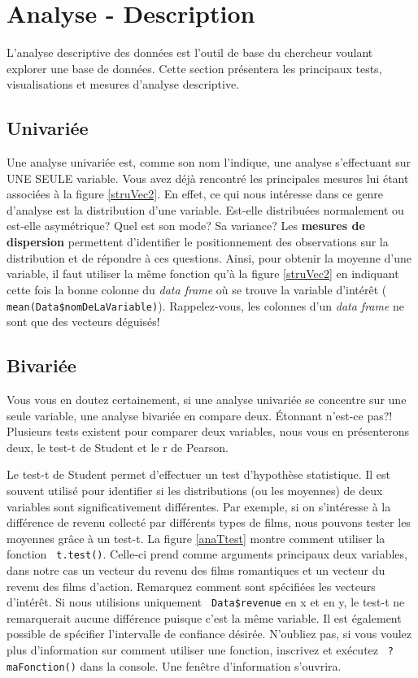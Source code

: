 \documentclass[10.5pt,a4paper]{article}
\newcommand{\rcode}[1]{\texttt{\color{rstudio} #1}}
\begin{document}
  
\section{Analyse - Description}
L'analyse descriptive des données est l'outil de base du chercheur voulant explorer une base de données. Cette section présentera les principaux tests, visualisations et mesures d'analyse descriptive.
  \subsection{Univariée}
  Une analyse univariée est, comme son nom l'indique, une analyse s'effectuant sur UNE SEULE variable. Vous avez déjà rencontré les principales mesures lui étant associées à la figure \ref{struVec2}. En effet, ce qui nous intéresse dans ce genre d'analyse est la distribution d'une variable. Est-elle distribuées normalement ou est-elle asymétrique? Quel est son mode? Sa variance? Les \textbf{mesures de dispersion} permettent d'identifier le positionnement des observations sur la distribution et de répondre à ces questions. Ainsi, pour obtenir la moyenne d'une variable, il faut utiliser la même fonction qu'à la figure \ref{struVec2} en indiquant cette fois la bonne colonne du \emph{data frame} où se trouve la variable d'intérêt (\rcode{mean(Data\$nomDeLaVariable)}). Rappelez-vous, les colonnes d'un \emph{data frame} ne sont que des vecteurs déguisés!
  
  \subsection{Bivariée}
  Vous vous en doutez certainement, si une analyse univariée se concentre sur une seule variable, une analyse bivariée en compare deux. Étonnant n'est-ce pas?! Plusieurs tests existent pour comparer deux variables, nous vous en présenterons deux, le test-t de Student et le r de Pearson. 
  
  Le test-t de Student permet d'effectuer un test d'hypothèse statistique. Il est souvent utilisé pour identifier si les distributions (ou les moyennes) de deux variables sont significativement différentes. Par exemple, si on s'intéresse à la différence de revenu collecté par différents types de films, nous pouvons tester les moyennes grâce à un test-t. La figure \ref{anaTtest} montre comment utiliser la fonction \rcode{t.test()}. Celle-ci prend comme arguments principaux deux variables, dans notre cas un vecteur du revenu des films romantiques et un vecteur du revenu des films d'action. Remarquez comment sont spécifiées les vecteurs d'intérêt. Si nous utilisions uniquement \rcode{Data\$revenue} en x et en y, le test-t ne remarquerait aucune différence puisque c'est la même variable. Il est également possible de spécifier l'intervalle de confiance désirée. N'oubliez pas, si vous voulez plus d'information sur comment utiliser une fonction, inscrivez et exécutez \rcode{?maFonction()} dans la console. Une fenêtre d'information s'ouvrira. 
  
\end{document}
